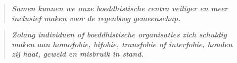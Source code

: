 \documentclass[12pt,openany]{book}
\begin{document}
\begin{figure}[ht]
\end{figure}

\color{purple}
\begin{quote}
\centering
\doublespacing
\textit{\Large \textbf{Samen kunnen we onze boeddhistische centra veiliger en meer inclusief maken voor de regenboog gemeenschap.}}
\end{quote}

\newpage
\thispagestyle{empty}

\begin{quote}
\doublespacing
\centering
\textit{\Large \textbf{Zolang individuen of boeddhistische organisaties zich schuldig maken aan homofobie, bifobie, transfobie of interfobie, houden zij haat, geweld en misbruik in stand.}}
\end{quote}

\begin{figure}[h]
    \centering
\end{figure}
\end{document}
